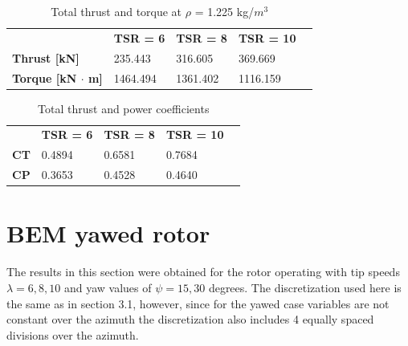 \begin{table}[htpb]
\caption{Total thrust and torque at $\rho$ = 1.225 kg/$m^3$}
\begin{tabular}{lllll}
\cline{2-4}
\multicolumn{1}{l|}{}                            & \multicolumn{1}{l|}{\textbf{TSR = 6}} & \multicolumn{1}{l|}{\textbf{TSR = 8}} & \multicolumn{1}{l|}{\textbf{TSR = 10}} &  \\ \cline{1-4}
\multicolumn{1}{|l|}{\textbf{Thrust {[}kN{]}}}   & \multicolumn{1}{l|}{235.443}          & \multicolumn{1}{l|}{316.605}          & \multicolumn{1}{l|}{369.669}           &  \\ \cline{1-4}
\multicolumn{1}{|l|}{\textbf{Torque {[}kN $\cdot$ m{]}}} & \multicolumn{1}{l|}{1464.494}         & \multicolumn{1}{l|}{1361.402}         & \multicolumn{1}{l|}{1116.159}          &  \\ \cline{1-4}
\end{tabular}
\label{total_forces_alligned}
\end{table}

\begin{table}[htpb]
\caption{Total thrust and power coefficients }
\begin{tabular}{lllll}
\cline{2-4}
\multicolumn{1}{l|}{}                            & \multicolumn{1}{l|}{\textbf{TSR = 6}} & \multicolumn{1}{l|}{\textbf{TSR = 8}} & \multicolumn{1}{l|}{\textbf{TSR = 10}} &  \\ \cline{1-4}
\multicolumn{1}{|l|}{\textbf{CT }}   & \multicolumn{1}{l|}{0.4894}          & \multicolumn{1}{l|}{0.6581}          & \multicolumn{1}{l|}{0.7684}           &  \\ \cline{1-4}
\multicolumn{1}{|l|}{\textbf{CP}} & \multicolumn{1}{l|}{0.3653}         & \multicolumn{1}{l|}{0.4528}         & \multicolumn{1}{l|}{0.4640}          &  \\ \cline{1-4}
\end{tabular}
\label{total_coef_alligned}
\end{table}


\section{BEM yawed rotor }

The results in this section were obtained for the rotor operating with tip speeds $\lambda = 6,8,10$ and yaw values of $\psi = 15, 30$ degrees. The discretization used here is the same as in section 3.1, however, since for the yawed case variables are not constant over the azimuth the discretization also includes 4 equally spaced divisions over the azimuth. 


